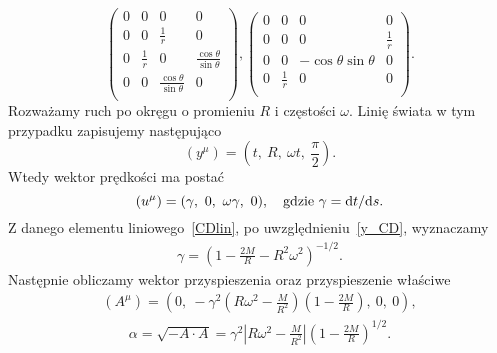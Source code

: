 $$
\left(
\begin{array}{cccc}
 0 & 0 & 0 & 0 \\
 0 & 0 & \frac{1}{r} & 0 \\
 0 & \frac{1}{r} & 0 & \frac{\cos \theta}{\sin\theta}  \\
 0 & 0 &\frac{ \cos \theta }{\sin \theta }  & 0 \\
\end{array}
\right),\left(
\begin{array}{cccc}
 0 & 0 & 0 & 0 \\
 0 & 0 & 0 & \frac{1}{r} \\
 0 & 0 & -\cos \theta\sin \theta  & 0 \\
 0 & \frac{1}{r} & 0 & 0 \\
\end{array}
\right) .
$$
Rozważamy ruch po okręgu o promieniu $R$ i częstości $\omega$.
Linię świata w tym przypadku zapisujemy następująco
\begin{equation}\label{y_CD}
(y^\mu) = \left( t,\ R,\ \omega t,\ \frac{\pi}{2}\right).
\end{equation}
Wtedy wektor prędkości ma postać
\begin{equation}\nonumber
(u^\mu)  %
= (\gamma,\ 0,\ \omega\gamma,\ 0),
\quad \text{gdzie } \gamma = \d t/\d s. 
\end{equation}
Z danego elementu liniowego~\eqref{CDlin}, 
po uwzględnieniu~\eqref{y_CD}, wyznaczamy
\begin{align}\nonumber
\gamma = 
 \left(1 - \frac{2 M}{R} - R^2\omega^2 \right)^{-1/2}.
\end{align}
Następnie obliczamy wektor przyspieszenia oraz przyspieszenie właściwe
\begin{align}\nonumber
(A^\mu) = \left(0,\ -\gamma^2 \left( R\omega^2 - \frac{M}{R^2} \right) 
\left(1-\frac{2M}{R}\right),\ 0,\ 0 \right) ,
\end{align}
\begin{align}\nonumber
\alpha = \sqrt{-A\cdot A} = \gamma^2 
\left| R\omega^2 - \frac{M}{R^2} \right|
\left( 1-\frac{2M}{R} \right)^{1/2} .
\end{align}

